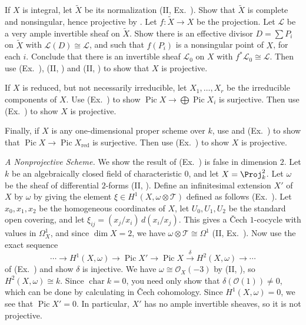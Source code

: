 {{{\noindent\hypertarget{ex-III-5.8b}{}If $X$ is integral, let $\widetilde X$ be its normalization (II, Ex.~). Show that $\widetilde X$ is complete and nonsingular, hence projective by . Let $f\colon\widetilde X\to X$ be the projection. Let $\mathcal L$ be a very ample invertible sheaf on $\widetilde X$. Show there is an effective divisor $D=\sum P_i$ on $\widetilde X$ with $\mathcal L(D)\cong\mathcal L$, and such that $f(P_i)$ is a nonsingular point of $X$, for each $i$. Conclude that there is an invertible sheaf $\mathcal L_0$ on $X$ with $f^*\mathcal L_0\cong\mathcal L$. Then use (Ex.~), (II, ) and (II, ) to show that $X$ is projective.

\noindent\hypertarget{ex-III-5.8c}{}If $X$ is reduced, but not necessarily irreducible, let $X_1,\ldots,X_r$ be the irreducible components of $X$. Use (Ex.~) to show $\operatorname{Pic}X\to\bigoplus\operatorname{Pic}X_i$ is surjective. Then use (Ex.~) to show $X$ is projective.

\noindent\hypertarget{ex-III-5.8d}{}Finally, if $X$ is any one-dimensional proper scheme over $k$, use  and (Ex.~) to show that $\operatorname{Pic}X\to\operatorname{Pic}X_{\mathrm{red}}$ is surjective. Then use (Ex.~) to show $X$ is projective.\par}

\smallskip
\noindent\hypertarget{ex-III-5.9}{}\emph{A Nonprojective Scheme.} We show the result of (Ex.~) is false in dimension $2$. Let $k$ be an algebraically closed field of characteristic $0$, and let $X=\Proj_k^2$. Let $\omega$ be the sheaf of differential $2$-forms (II, ). Define an infinitesimal extension $X'$ of $X$ by $\omega$ by giving the element $\xi\in H^1(X,\omega\otimes\mathcal T)$ defined as follows (Ex.~). Let $x_0,x_1,x_2$ be the homogeneous coordinates of $X$, let $U_0,U_1,U_2$ be the standard open covering, and let $\xi_{ij}=(x_j/x_i)\,d(x_i/x_j)$. This gives a \v{C}ech $1$-cocycle with values in $\Omega_X^1$, and since $\dim X=2$, we have $\omega\otimes\mathcal T\cong\Omega^1$ (II, Ex.~). Now use the exact sequence
\[
\cdots\to H^1(X,\omega)\to\operatorname{Pic}X'\to\operatorname{Pic}X\xrightarrow{\delta}H^2(X,\omega)\to\cdots
\]
of (Ex.~) and show $\delta$ is injective. We have $\omega\cong\mathcal O_X(-3)$ by (II, ), so $H^2(X,\omega)\cong k$. Since $\operatorname{char}k=0$, you need only show that $\delta(\mathcal O(1))\ne0$, which can be done by calculating in \v{C}ech cohomology. Since $H^1(X,\omega)=0$, we see that $\operatorname{Pic}X'=0$. In particular, $X'$ has no ample invertible sheaves, so it is not projective.

}}
